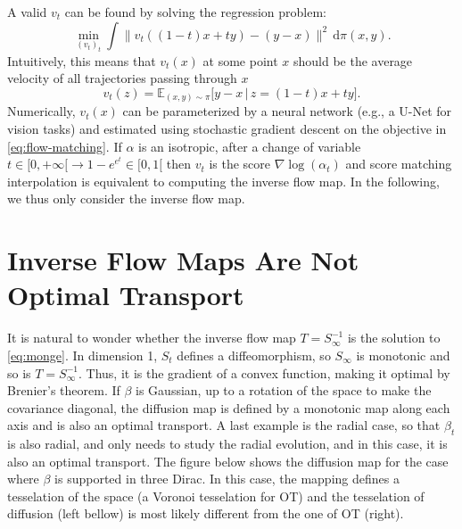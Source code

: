 \documentclass{article}
\begin{document}
A valid $v_t$ can be found by solving the regression problem:
\begin{equation}
    \min_{(v_t)_t} \int \|v_t((1-t)x + ty) - (y - x)\|^2 \, \mathrm{d}\pi(x, y). \label{eq:flow-matching}
\end{equation}
Intuitively, this means that $v_t(x)$ at some point $x$ should be the average velocity of all trajectories passing through $x$
$$
		v_t(z) = \mathbb{E}_{(x, y) \sim \pi} \big[ y - x \, \big| \, z = (1-t)x + t y \big].
$$
Numerically, $v_t(x)$ can be parameterized by a neural network (e.g., a U-Net for vision tasks) and estimated using stochastic gradient descent on the objective in \eqref{eq:flow-matching}.
%
If $\alpha$ is an isotropic, after a change of variable $t \in [0,+\infty[ \to 1-e^{e^{t}} \in [0,1[$ then $v_t$ is the score $\nabla \log(\alpha_t)$ and score matching interpolation is equivalent to computing the inverse flow map. In the following, we thus only consider the inverse flow map.

\section{Inverse Flow Maps Are Not Optimal Transport}

It is natural to wonder whether the inverse flow map $T=S_\infty^{-1}$ is the solution to \eqref{eq:monge}. In dimension 1, $S_t$ defines a diffeomorphism, so $S_\infty$ is monotonic and so is $T=S_\infty^{-1}$. Thus, it is the gradient of a convex function, making it optimal by Brenier's theorem. If $\beta$ is Gaussian, up to a rotation of the space to make the covariance diagonal, the diffusion map is defined by a monotonic map along each axis and is also an optimal transport. A last example is the radial case, so that $\beta_t$ is also radial, and only needs to study the radial evolution, and in this case, it is also an optimal transport.
%
The figure below shows the diffusion map for the case where $\beta$ is supported in three Dirac. In this case, the mapping defines a tesselation of the space (a Voronoi tesselation for OT) and the tesselation of diffusion (left bellow) is most likely different from the one of OT (right).   
\end{document}
